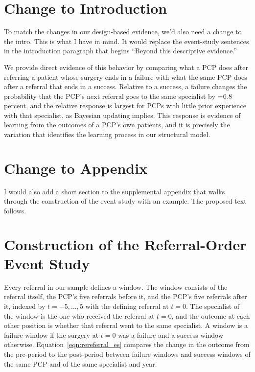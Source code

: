 \documentclass[12pt]{article}
\begin{document}
\clearpage
\section*{Change to Introduction}

To match the changes in our design-based evidence, we'd also need a change to the intro. This is what I have in mind. It would replace the event-study sentences in the introduction paragraph that begins ``Beyond this descriptive evidence.''

\medskip
\noindent We provide direct evidence of this behavior by comparing what a PCP does after referring a patient whose surgery ends in a failure with what the same PCP does after a referral that ends in a success. Relative to a success, a failure changes the probability that the PCP's next referral goes to the same specialist by $-6.8{}$ percent, and the relative response is largest for PCPs with little prior experience with that specialist, as Bayesian updating implies. This response is evidence of learning from the outcomes of a PCP's own patients, and it is precisely the variation that identifies the learning process in our structural model.

\clearpage
\section*{Change to Appendix}

I would also add a short section to the supplemental appendix that walks through the construction of the event study with an example. The proposed text follows.

\medskip
\section*{Construction of the Referral-Order Event Study}
\label{sec:app_es}

Every referral in our sample defines a window. The window consists of the referral itself, the PCP's five referrals before it, and the PCP's five referrals after it, indexed by $t=-5,\ldots,5$ with the defining referral at $t=0$. The specialist of the window is the one who received the referral at $t=0$, and the outcome at each other position is whether that referral went to the same specialist. A window is a failure window if the surgery at $t=0$ was a failure and a success window otherwise. Equation~\eqref{eqn:rereferral_es} compares the change in the outcome from the pre-period to the post-period between failure windows and success windows of the same PCP and of the same specialist and year.
\end{document}
